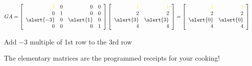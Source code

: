 \documentclass[pdf,9pt]{beamer}
\begin{document}
{\begin{example}[continued]
    \begin{minipage}{0.65\textwidth}
    \[
	GA=
	\left[ \begin{array}{rrrr}
		\textcolor{yellow}{1} & 0 & 0         & 0 \\
		0                     & 1 & 0         & 0 \\
		\alert{-3}            & 0 & \alert{1} & 0 \\
		0                     & 0 & 0         & 1
	\end{array}\right]
	\left[ \begin{array}{rr}
		\textcolor{yellow}{1} & \textcolor{yellow}{1} \\ 2 & 2 \\ \alert{3} & \alert{3} \\ 4 & 4
	\end{array}\right]=
	\left[ \begin{array}{rr}
		\textcolor{yellow}{1} & \textcolor{yellow}{1} \\
		2                     & 2                     \\
		\alert{0}             & \alert{0}             \\
		4                     & 4                     \\
	\end{array}\right]
    \]
    \end{minipage}
    \hfill
    \begin{minipage}{0.3\textwidth}
    \begin{center}
       Add $-3$ multiple of 1st row to the 3rd row
    \end{center}
    \end{minipage}

    \myQED
\end{example}
\vfill
\begin{remark}
    The elementary matrices are the programmed receipts for your cooking!
\end{remark}
}
\end{document}
